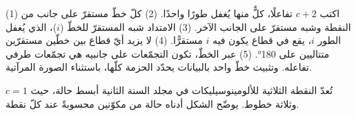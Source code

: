 \begin{method}\label{met:b3:petrological-thermodynamics:schreinemakers}
(1) اكتب $c + 2$ تفاعلًا، كلٌّ منها يُغفل طورًا واحدًا. (2) كلّ خطّ
مستقرّ على جانب من النقطة وشبه مستقرّ على الجانب الآخر. (3)
الامتداد شبه المستقرّ للخطّ ($i$)، الذي يُغفل الطور $i$، يقع في قطاع
يكون فيه $i$ مستقرًّا. (4) لا يزيد أيّ قطاع بين خطّين مستقرّين متتاليين
على \ang{180}. (5) عبر الخطّ، تكون التجمّعات على جانبيه
هي تجمّعات طرفي تفاعله. وتثبيت خطّ واحد بالبيانات
يحدّد الحزمة كلّها، باستثناء الصورة المرآتية.
\end{method}

تُعدّ النقطة الثلاثية للألومينوسيليكات في مجلد السنة الثانية أبسط حالة،
حيث $c = 1$ وثلاثة خطوط. يوضّح الشكل أدناه حالة من مكوّنين
محسوبةً  عند كلّ نقطة.

